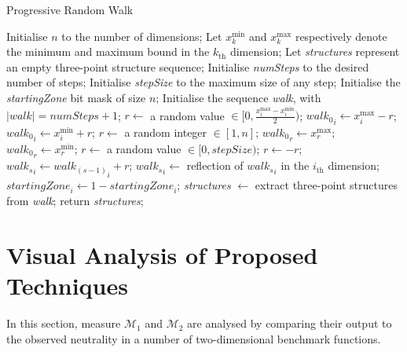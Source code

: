 \documentclass[conference]{IEEEtran}
\begin{document}
\begin{algorithm}[!t]
	\caption{Progressive Random Walk}
	\label{algProgRandomWalk}
	\begin{algorithmic}
		\STATE Initialise $n$ to the number of dimensions;
		\STATE Let $x_k^{\text{min}}$ and $x_k^{\text{max}}$ respectively denote the minimum and maximum bound in the $k_{\text{th}}$ dimension;
		\STATE Let \textit{structures} represent an empty three-point structure sequence;
		\STATE Initialise \textit{numSteps} to the desired number of steps;
		\STATE Initialise \textit{stepSize} to the maximum size of any step;
		\STATE Initialise the \textit{startingZone} bit mask of size $n$; 
		\STATE Initialise the sequence \textit{walk}, with $\lvert \textit{walk} \rvert = \textit{numSteps} + 1$;
			\STATE	$r \gets$ a random value $\in [0, \frac{x_i^{\text{max}} - x_i^{\text{min}}}{2})$;	
				\STATE ${{\textit{walk}}_0}_i \gets x_i^{\text{max}} - r$;
			\ELSE
				\STATE ${{\textit{walk}}_0}_i \gets x_i^{\text{min}} + r$;
			\ENDIF			
		\ENDFOR
		\STATE $r \gets$ a random integer $\in [1,n]$;
			\STATE ${{\textit{walk}}_0}_{r} \gets x_{r}^{\text{max}}$;
		\ELSE
			\STATE ${{\textit{walk}}_0}_{r} \gets x_{r}^{\text{min}}$;
		\ENDIF	
				\STATE	$r \gets$ a random value $\in [0, \textit{stepSize})$;	
					\STATE $r \gets -r$;				
				\ENDIF			
				\STATE ${{\textit{walk}}_s}_i \gets {{\textit{walk}}_{(s-1)}}_i + r$;
					\STATE ${{\textit{walk}}_s}_i \gets$ reflection of ${{\textit{walk}}_s}_i$ in the $i_{\text{th}}$ dimension;
					\STATE ${\textit{startingZone}}_i \gets 1 - {\textit{startingZone}}_i$;
				\ENDIF
			\ENDFOR	
		\ENDFOR
		\STATE \textit{structures} $\gets$ extract three-point structures from \textit{walk};
		\STATE return \textit{structures};
	\end{algorithmic}	
\end{algorithm} 


\section{Visual Analysis of Proposed Techniques}
\label{visualAnalysis}
In this section, measure $\mathcal{M}_1$ and $\mathcal{M}_2$ are analysed by comparing their output to the observed neutrality in a number of two-dimensional benchmark functions. 
\end{document}

